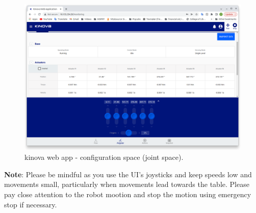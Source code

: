 \documentclass[12pt]{article}
\begin{document}
\begin{enumerate}
    \begin{figure}[H]
    \vspace{-10pt}
    \centering\includegraphics[width=12cm]{images/kinova3.PNG}\vspace{-10pt}
    \caption{kinova web app - configuration space (joint space).}\label{fig:kinova3}
    \end{figure}
\end{enumerate}
\textbf{Note}: Please be mindful as you use the UI’s joysticks and keep speeds low and movements small, particularly when movements lead towards the table. Please pay close attention to the robot mootion and stop the motion using emergency stop if necessary. \\
\end{document}
